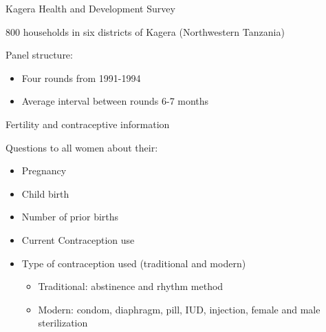 \documentclass[red]{beamer}
\begin{document}
\begin{frame}{Kagera Health and Development Survey}

800 households in six districts of Kagera (Northwestern Tanzania)

\bigskip

Panel structure:
\begin{itemize}
\item Four rounds from 1991-1994 
\item Average interval between rounds 6-7 months 
\end{itemize}

\bigskip
{}
\end{frame}


\begin{frame}{Fertility and contraceptive information}

Questions to all women about their:
\begin{itemize}
\item Pregnancy
\item Child birth
\item Number of prior births
\item Current Contraception use
\item Type of contraception used (traditional and modern)
	\begin{itemize}
	\item Traditional: abstinence and rhythm method
	\item Modern: condom, diaphragm, pill, IUD, injection, female and male sterilization
	\end{itemize}
\end{itemize}
\end{frame}
\end{document}
